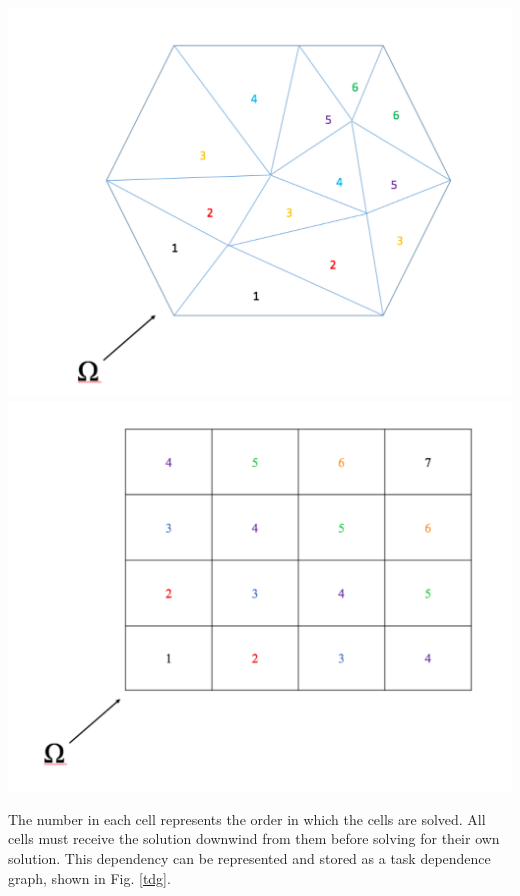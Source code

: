 \documentclass[11pt, letterpaper,titlepage,oneside]{article}
\begin{document}
\noindent\begin{minipage}{\textwidth}
\centering
\includegraphics[scale = 0.27]{UnstructureMesh.pdf}
\includegraphics[scale = 0.27]{StructuredMesh.pdf}
\label{sweeps}
\end{minipage}
\smallskip

The number in each cell represents the order in which the cells are solved. All cells must receive the solution downwind from them before solving for their own solution. This dependency can be represented and stored as a task dependence graph, shown in Fig. \ref{tdg}.
\end{document}
